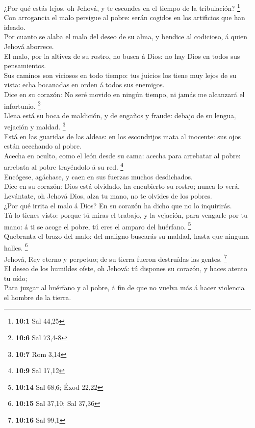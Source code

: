  ¿Por qué estás lejos, oh Jehová, y te escondes en el tiempo
de la tribulación? \footnote{\textbf{10:1} Sal 44,25}\\
 Con arrogancia el malo persigue al pobre: serán cogidos en
los artificios que han ideado.\\
 Por cuanto se alaba el malo del deseo de su alma, y bendice
al codicioso, á quien Jehová aborrece.\\
 El malo, por la altivez de su rostro, no busca á Dios: no
hay Dios en todos sus pensamientos.\\
 Sus caminos son viciosos en todo tiempo: tus juicios los
tiene muy lejos de su vista: echa bocanadas en orden á todos sus
enemigos.\\
 Dice en su corazón: No seré movido en ningún tiempo, ni
jamás me alcanzará el infortunio. \footnote{\textbf{10:6} Sal 73,4-8}\\
 Llena está su boca de maldición, y de engaños y fraude:
debajo de su lengua, vejación y maldad. \footnote{\textbf{10:7} Rom 3,14}\\
 Está en las guaridas de las aldeas: en los escondrijos mata
al inocente: sus ojos están acechando al pobre.\\
 Acecha en oculto, como el león desde su cama: acecha para
arrebatar al pobre: arrebata al pobre trayéndolo á su red. \footnote{\textbf{10:9}
  Sal 17,12}\\
 Encógese, agáchase, y caen en sus fuerzas muchos
desdichados.\\
 Dice en su corazón: Dios está olvidado, ha encubierto su
rostro; nunca lo verá.\\
 Levántate, oh Jehová Dios, alza tu mano, no te olvides de
los pobres.\\
 ¿Por qué irrita el malo á Dios? En su corazón ha dicho que
no lo inquirirás.\\
 Tú lo tienes visto: porque tú miras el trabajo, y la
vejación, para vengarle por tu mano: á ti se acoge el pobre, tú eres el
amparo del huérfano. \footnote{\textbf{10:14} Sal 68,6; Éxod 22,22}\\
 Quebranta el brazo del malo: del maligno buscarás su
maldad, hasta que ninguna halles. \footnote{\textbf{10:15} Sal 37,10;
  Sal 37,36}\\
 Jehová, Rey eterno y perpetuo; de su tierra fueron
destruídas las gentes. \footnote{\textbf{10:16} Sal 99,1}\\
 El deseo de los humildes oíste, oh Jehová: tú dispones su
corazón, y haces atento tu oído;\\
 Para juzgar al huérfano y al pobre, á fin de que no vuelva
más á hacer violencia el hombre de la tierra.


